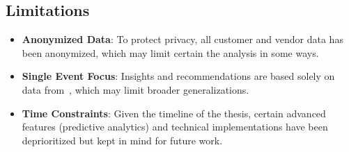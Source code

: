 \subsection*{Limitations}
\label{subsec:introduction-limitations}
\begin{itemize}
	\item \textbf{Anonymized Data}: To protect privacy, all customer and vendor data has been anonymized, which may limit certain the analysis in some ways.
	\item \textbf{Single Event Focus}: Insights and recommendations are based solely on data from~\theEvent, which may limit broader generalizations.
	\item \textbf{Time Constraints}: Given the timeline of the thesis, certain advanced features (\eg predictive analytics) and technical implementations have been deprioritized but kept in mind for future work.
\end{itemize}
